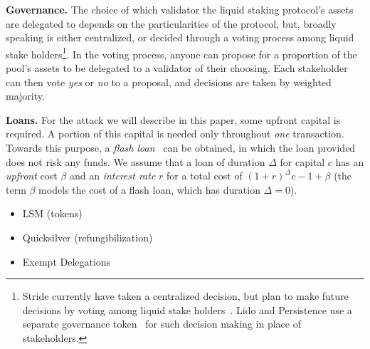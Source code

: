 

\noindent
\textbf{Governance.}
The choice of which validator the liquid staking protocol's assets are delegated to
depends on the particularities of the protocol, but, broadly speaking
is either centralized, or decided through a voting process among
liquid stake holders\footnote{Stride currently have
taken a centralized decision, but plan to make future decisions by voting
among liquid stake holders~\cite{stride-validators}. Lido and Persistence
use a separate governance token~\cite{lido-validators,persistence-validators} for
such decision making in place of stakeholders.}.
In the voting process, anyone can propose for a proportion of the pool's assets
to be delegated to a validator of their choosing.
Each stakeholder can then vote \emph{yes} or \emph{no}
to a proposal, and decisions are taken by weighted majority.

\noindent
\textbf{Loans.} For the attack we will describe in this paper, some upfront
capital is required. A portion of this capital is needed only throughout \emph{one}
transaction. Towards this purpose, a \emph{flash loan}~\cite{gudgeon2020defi} can
be obtained, in which the loan provided does not risk any funds. We assume that
a loan of duration $\Delta$ for capital $c$ has an \emph{upfront} cost $\beta$
and an \emph{interest rate} $r$ for a total cost of
$(1 + r)^\Delta c - 1 + \beta$ (the term $\beta$ models the cost of a flash loan,
which has duration $\Delta = 0$).

\begin{itemize}
  \item LSM (tokens)
  \item Quicksilver (refungibilization)
  \item Exempt Delegations
\end{itemize}
